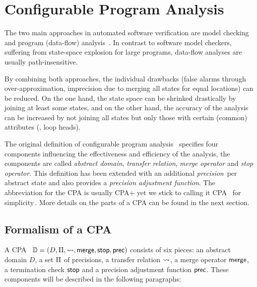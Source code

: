 \section{Configurable Program Analysis}
The two main approaches in automated software verification are model checking and program (data-flow) analysis~\cite{Beyer:CPA}. In contrast to software model checkers, suffering from 
state-space explosion for large programs, data-flow analyses are usually path-insensitive.

By combining both approaches, the individual drawbacks (false alarms through over-approximation, imprecision due to merging all states for equal locations) can be reduced. On the one hand, the state 
space can be shrinked drastically by joining at least some states, and on the other hand, the accuracy of the analysis can be increased by not joining all states but only those with certain (common) 
attributes (\eg, loop heads).

The original definition of configurable program analysis~\cite{Beyer:CPA} specifies four components influencing the effectiveness and efficiency of the analysis, the components are called 
\emph{abstract domain}, \emph{transfer relation}, \emph{merge operator} and \emph{stop operator}.
This definition has been extended with an additional \emph{precision}\, per abstract state and also provides a \emph{precision adjustment function}. The abbreviation for the \ac{CPA} is usually CPA+ yet we stick to calling it 
\ac{CPA}~\cite{Beyer:DynamicPrecisionAdjustment} for simplicity\,. 
More details on the parts of a \acs{CPA} can be found in the next section.

\subsection{Formalism of a \acs{CPA}}
A \ac{CPA}~\cite{Beyer:DynamicPrecisionAdjustment} $\mathbb{D} = (D, \Pi, \operatorname{\leadsto}, \operatorname{\mathsf{merge}}, \operatorname{\mathsf{stop}}, \operatorname{\mathsf{prec}})$ consists of six pieces: an abstract domain $D$, a set $\Pi$ of precisions, a transfer relation $\operatorname{\leadsto}$, a merge operator $\operatorname{\mathsf{merge}}$, a termination check $\operatorname{\mathsf{stop}}$ and a precision adjustment function $\operatorname{\mathsf{prec}}$. These components will be described in the following paragraphs:

